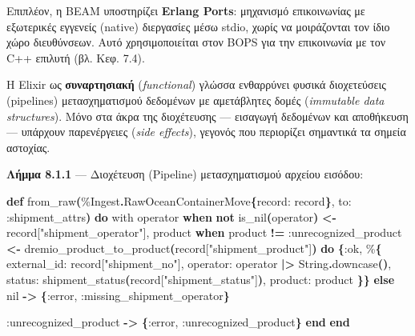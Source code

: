 \documentclass[11pt,a4paper,greek,twoside]{template-xe}
\newenvironment{Shaded}{\begin{english}\begin{snugshade}}{\end{snugshade}\end{english}}
\newcommand{\ConstantTok}[1]{\textcolor[rgb]{0.56,0.35,0.01}{#1}}
\newcommand{\ControlFlowTok}[1]{\textcolor[rgb]{0.13,0.29,0.53}{\textbf{#1}}}
\newcommand{\FunctionTok}[1]{\textcolor[rgb]{0.13,0.29,0.53}{\textbf{#1}}}
\newcommand{\KeywordTok}[1]{\textcolor[rgb]{0.13,0.29,0.53}{\textbf{#1}}}
\newcommand{\NormalTok}[1]{#1}
\newcommand{\OperatorTok}[1]{\textcolor[rgb]{0.81,0.36,0.00}{\textbf{#1}}}
\newcommand{\OtherTok}[1]{\textcolor[rgb]{0.56,0.35,0.01}{#1}}
\newcommand{\StringTok}[1]{\textcolor[rgb]{0.31,0.60,0.02}{#1}}
\newcommand{\VariableTok}[1]{\textcolor[rgb]{0.00,0.00,0.00}{#1}}
\begin{document}
Επιπλέον, η BEAM υποστηρίζει \textbf{Erlang Ports}: μηχανισμό
επικοινωνίας με εξωτερικές εγγενείς (native) διεργασίες μέσω stdio,
χωρίς να μοιράζονται τον ίδιο χώρο διευθύνσεων. Αυτό χρησιμοποιείται
στον BOPS για την επικοινωνία με τον C++ επιλυτή (βλ. Κεφ. 7.4).

Η Elixir ως \textbf{συναρτησιακή} (\emph{functional}) γλώσσα ενθαρρύνει
φυσικά διοχετεύσεις (pipelines) μετασχηματισμού δεδομένων με αμετάβλητες
δομές (\emph{immutable data structures}). Μόνο στα άκρα της διοχέτευσης
--- εισαγωγή δεδομένων και αποθήκευση --- υπάρχουν παρενέργειες
(\emph{side effects}), γεγονός που περιορίζει σημαντικά τα σημεία
αστοχίας.

\textbf{Λήμμα 8.1.1} --- Διοχέτευση (Pipeline) μετασχηματισμού αρχείου
εισόδου:

\begin{Shaded}
\begin{Highlighting}[]
\KeywordTok{def}\NormalTok{ from\_raw}\FunctionTok{(}\NormalTok{\%}\ConstantTok{Ingest}\OperatorTok{.}\ConstantTok{RawOceanContainerMove}\FunctionTok{\{}\VariableTok{record:}\NormalTok{ record}\FunctionTok{\}}\NormalTok{, }\VariableTok{to:} \VariableTok{:shipment\_attrs}\FunctionTok{)} \KeywordTok{do}
\NormalTok{  with operator }\KeywordTok{when} \KeywordTok{not}\NormalTok{ is\_nil}\FunctionTok{(}\NormalTok{operator}\FunctionTok{)} \OperatorTok{\textless{}{-}}\NormalTok{ record}\OtherTok{[}\StringTok{"shipment\_operator"}\OtherTok{]}\NormalTok{,}
\NormalTok{       product }\KeywordTok{when}\NormalTok{ product}\OperatorTok{ !=} \VariableTok{:unrecognized\_product} \OperatorTok{\textless{}{-}}
\NormalTok{         dremio\_product\_to\_product}\FunctionTok{(}\NormalTok{record}\OtherTok{[}\StringTok{"shipment\_product"}\OtherTok{]}\FunctionTok{)} \KeywordTok{do}
    \FunctionTok{\{}\VariableTok{:ok}\NormalTok{,}
\NormalTok{     \%}\FunctionTok{\{}
       \VariableTok{external\_id:}\NormalTok{ record}\OtherTok{[}\StringTok{"shipment\_no"}\OtherTok{]}\NormalTok{,}
       \VariableTok{operator:}\NormalTok{ operator }\OperatorTok{|\textgreater{}} \ConstantTok{String}\OperatorTok{.}\NormalTok{downcase}\FunctionTok{()}\NormalTok{,}
       \VariableTok{status:}\NormalTok{ shipment\_status}\FunctionTok{(}\NormalTok{record}\OtherTok{[}\StringTok{"shipment\_status"}\OtherTok{]}\FunctionTok{)}\NormalTok{,}
       \VariableTok{product:}\NormalTok{ product}
     \FunctionTok{\}\}}
  \ControlFlowTok{else}
    \ConstantTok{nil} \OperatorTok{{-}\textgreater{}}
      \FunctionTok{\{}\VariableTok{:error}\NormalTok{, }\VariableTok{:missing\_shipment\_operator}\FunctionTok{\}}

    \VariableTok{:unrecognized\_product} \OperatorTok{{-}\textgreater{}}
      \FunctionTok{\{}\VariableTok{:error}\NormalTok{, }\VariableTok{:unrecognized\_product}\FunctionTok{\}}
  \KeywordTok{end}
\KeywordTok{end}
\end{Highlighting}
\end{Shaded}
\end{document}
